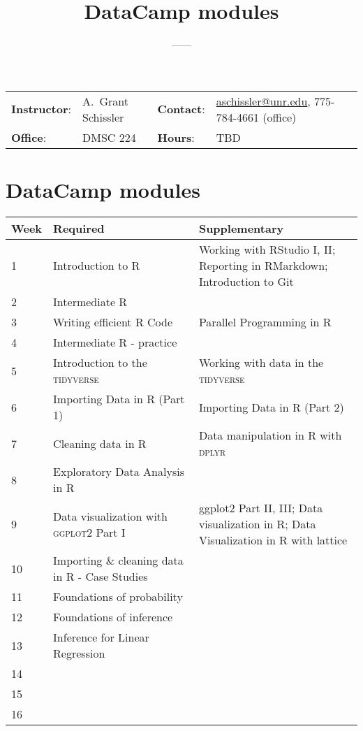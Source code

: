\documentclass[11pt,onecolumn]{article}
\title{\textbf{\coursename\\DataCamp modules}}
\author{{\semester}---{\roomnumb}---{\classtimes}}
\date{}
\makeatletter
\newcommand{\myname}{A.~Grant Schissler}
\newcommand{\myemail}{aschissler@unr.edu}
\newcommand{\office}{DMSC 224}
\newcommand{\officehours}{TBD}
\makeatother
\begin{document}
\maketitle

\vspace{-0.25in}
\noindent\makebox[\linewidth]{\rule{\textwidth}{1pt}}

\begin{center}
\begin{tabular}{llll}
\textbf{Instructor}:&\myname & \textbf{Contact}:&\href{mailto:\myemail}{\myemail}, 775-784-4661 (office)\\
\textbf{Office}:&\office & \textbf{Hours}:&\officehours\\
\end{tabular}
\end{center}

\noindent\makebox[\linewidth]{\rule{\textwidth}{1pt}}

\section*{DataCamp modules}
\begin{center}
  \begin{tabular}{|p{0.05\linewidth}|p{0.45\linewidth}|p{0.5\linewidth}|}
    \hline
    Week & Required & Supplementary \\
    \hline
    \hline
    1 & Introduction to R & Working with RStudio I, II; Reporting in RMarkdown; Introduction to Git \\
    \hline
    2 & Intermediate R & \\
    \hline
    3 & Writing efficient R Code & Parallel Programming in R \\ 
    \hline
    4 & Intermediate R - practice & \\
    \hline
    \hline
    5 & Introduction to the \textsc{tidyverse} & Working with data in the \textsc{tidyverse} \\
    \hline
    6 & Importing Data in R (Part 1) & Importing Data in R (Part 2) \\ 
    \hline
    7 & Cleaning data in R & Data manipulation in R with \textsc{dplyr} \\
    \hline
    8 & Exploratory Data Analysis in R &  \\
    \hline
    9 & Data visualization with \textsc{ggplot2} Part I & ggplot2 Part II, III; Data visualization in R; Data Visualization in R with lattice \\
    \hline
    10 & Importing \& cleaning data in R - Case Studies &  \\
    \hline
    \hline
    11 & Foundations of probability &  \\
    \hline
    12 & Foundations of inference &  \\
    \hline
    13 & Inference for Linear Regression & \\
    \hline
    14 & & \\
    \hline
    15 & & \\
    \hline
    16 & & \\
    \hline
\end{tabular}
\end{center}
\end{document}
